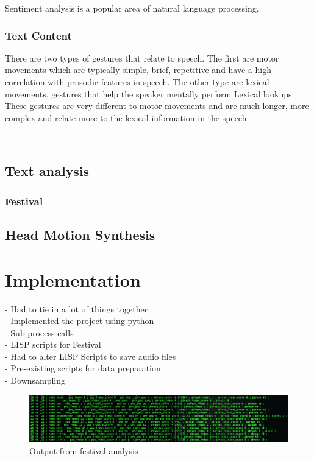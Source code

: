 \documentclass[bsc,frontabs,twoside,singlespacing,parskip]{infthesis}
\begin{document}
Sentiment analysis is a popular area of natural language processing.

\subsection{Text Content}

There are two types of gestures that relate to speech. \cite{lexical_gestures} The first are motor movements which are typically simple, brief, repetitive and have a high correlation with prosodic features in speech. The other type are lexical movements, gestures that help the speaker mentally perform Lexical lookups. These gestures are very different to motor movements and are much longer, more complex and relate more to the lexical information in the speech.

\cite{kendon} \\

\section{Text analysis}
\subsection{Festival}

\section{Head Motion Synthesis}

\chapter{Implementation}

- Had to tie in a lot of things together \\
- Implemented the project using python \\
- Sub process calls \\
- LISP scripts for Festival \\
- Had to alter LISP Scripts to save audio files \\
- Pre-existing scripts for data preparation \\
- Downsampling

\begin{figure}
	\includegraphics[width=1.1\textwidth]{festival_output.png}
	\caption{Output from festival analysis}
\end{figure}
\end{document}
